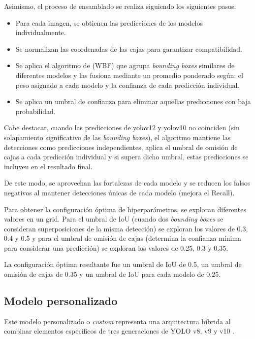 \documentclass[12pt,a4paper,onecolumn,oneside]{report}
\begin{document}
Asimismo, el proceso de ensamblado se realiza siguiendo los siguientes pasos:

\begin{itemize}
  \item Para cada imagen, se obtienen las predicciones de los modelos individualmente.
  \item Se normalizan las coordenadas de las cajas para garantizar compatibilidad.
  \item Se aplica el algoritmo de (WBF) que agrupa \textit{bounding boxes} similares de diferentes modelos y las fusiona mediante un promedio ponderado según: el peso asignado a cada modelo y la confianza de cada predicción individual.
  \item Se aplica un umbral de confianza para eliminar aquellas predicciones con baja probabilidad.
\end{itemize}

Cabe destacar, cuando las predicciones de yolov12 y yolov10 no coinciden (sin solapamiento significativo de las \textit{bounding boxes}), el algoritmo mantiene las detecciones como predicciones independientes,
aplica el umbral de omisión de cajas a cada predicción individual y si supera dicho umbral, estas predicciones se incluyen en el resultado final.

De este modo, se aprovechan las fortalezas de cada modelo y se reducen los falsos negativos al mantener detecciones únicas de cada modelo (mejora el Recall).

Para obtener la configuración óptima de hiperparámetros, se exploran diferentes valores en un grid. Para el umbral de IoU (cuando dos \textit{bounding boxes} se consideran superposiciones de la misma detección) se exploran los valores 
de 0.3, 0.4 y 0.5 y para el umbral de omisión de cajas (determina la confianza mínima para considerar una predicción) se exploran los valores de 0.25, 0.3 y 0.35.

La configuración óptima resultante fue un umbral de IoU de 0.5, un umbral de omisión de cajas de 0.35 y un umbral de IoU para cada modelo de 0.25.

\subsection{Modelo personalizado}

Este modelo personalizado o \textit{custom} representa una arquitectura híbrida al combinar elementos específicos de tres generaciones de YOLO v8, v9 y v10 \cite{repoTFM}. 
\end{document}
